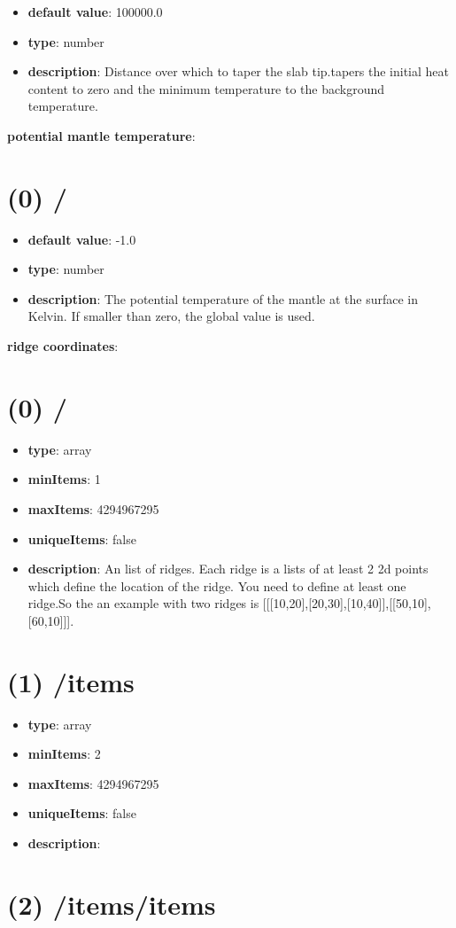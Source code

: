 \begin{itemize}[leftmargin=0em]\item {\bf default value}: 100000.0
\item {\bf type}: number
\item {\bf description}: Distance over which to taper the slab tip.tapers the initial heat content to zero and the minimum temperature to the background temperature.
\end{itemize}\item {\bf potential mantle temperature}: \section{(0) /}
\begin{itemize}[leftmargin=0em]\item {\bf default value}: -1.0
\item {\bf type}: number
\item {\bf description}: The potential temperature of the mantle at the surface in Kelvin. If smaller than zero, the global value is used.
\end{itemize}\item {\bf ridge coordinates}: \section{(0) /}
\begin{itemize}[leftmargin=0em]\item {\bf type}: array
\item {\bf minItems}: 1
\item {\bf maxItems}: 4294967295
\item {\bf uniqueItems}: false
\item {\bf description}: An list of ridges. Each ridge is a lists of at least 2 2d points which define the location of the ridge. You need to define at least one ridge.So the an example with two ridges is [[[10,20],[20,30],[10,40]],[[50,10],[60,10]]].
\end{itemize}\section{(1) /items}
\begin{itemize}[leftmargin=1em]\item {\bf type}: array
\item {\bf minItems}: 2
\item {\bf maxItems}: 4294967295
\item {\bf uniqueItems}: false
\item {\bf description}: 
\end{itemize}\section{(2) /items/items}
